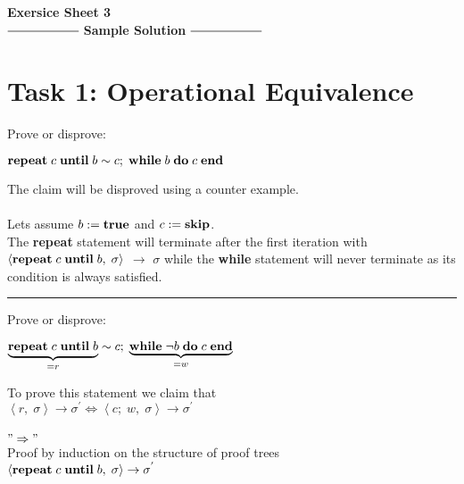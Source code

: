 \documentclass[12pt]{scrartcl}
\newcommand{\eState}[2]{$\left\langle \text{#1},\; \text{#2}\right\rangle$}
\newcommand{\eRule}[3]{\eState{#1}{#2} $\rightarrow$ #3}
\newcommand{\rep}{\text{\textbf{repeat}}}
\newcommand{\un}{\text{\textbf{until}}}
\begin{document}
\begin{center}
	\huge\textbf{Exersice Sheet 3}\\[0.5cm]
	
	\Large
	$\mathrel{\vcenter{\hbox{\rule{2cm}{0.5pt}}}}$ \textbf{Sample 				Solution} $\mathrel{\vcenter{\hbox{\rule{2cm}{0.5pt}}}}$\\[1cm]
\end{center}
	\large

	\section*{Task 1: Operational Equivalence}
	
	\indent\indent Prove or disprove:
	\begin{center}
		$\text{\textbf{repeat}}\; c\; \text{\textbf{until}}\; b \sim c;\; \text{\textbf{while}}\; b\; \text{\textbf{do}}\; c\; \text{\textbf{end}}$
	\end{center}
	\indent\indent The claim will be disproved using a counter example.\\\\
	\indent Lets assume $b:=\text{\textbf{true}}$ and $c:=\text{\textbf{skip}}$.\\
	\indent The \textbf{repeat} statement will terminate after the first iteration with\\\indent \eRule{$\text{\textbf{repeat}}\; c\; \text{\textbf{until}}\; b$}{$\sigma$}{$\sigma$} while the \textbf{while} statement will never terminate as \indent its condition is always satisfied.
	
	\rule{17cm}{0.4pt}\vspace{1cm}
	
	\indent Prove or disprove:
	\begin{center}
		$\underbrace{\text{\textbf{repeat}}\; c\; \text{\textbf{until}}\; b}_{=r} \sim c;\;\underbrace{\text{\textbf{while}}\; \neg b\; \text{\textbf{do}}\; c\; \text{\textbf{end}}}_{=w}$
	\end{center}
	
	\indent To prove this statement we claim that\\\indent $\left\langle r,\; \sigma\right\rangle\rightarrow\sigma^{'}\Leftrightarrow\left\langle c;\; w,\; \sigma\right\rangle\rightarrow\sigma^{'}$\\\\
	\indent $"\Rightarrow"$\\
	\indent\indent Proof by induction on the structure of proof trees\\\indent\indent $\left\langle \rep\; c\; \un\; b,\; \sigma\right\rangle\rightarrow\sigma^{'}$
	
\end{document}
